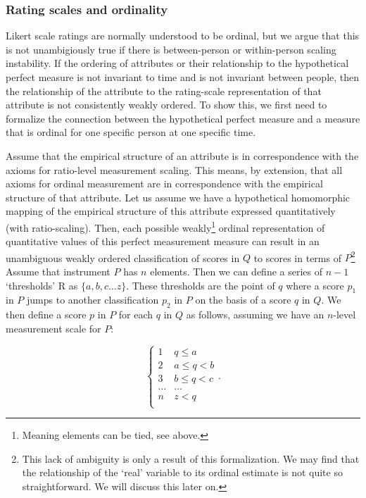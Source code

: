 \documentclass[utf8]{FrontiersinVancouver}
\begin{document}
\subsubsection{Rating scales and ordinality}
Likert scale ratings are normally understood to be ordinal, but we argue that this is not unambigiously true if there is between-person or within-person scaling instability. If the ordering of attributes or their relationship to the hypothetical perfect measure is not invariant to time and is not invariant between people, then the relationship of the attribute to the rating-scale representation of that attribute is not consistently weakly ordered. To show this, we first need to formalize the connection between the hypothetical perfect measure and a measure that is ordinal for one specific person at one specific time.

Assume that the empirical structure of an attribute is in correspondence with the axioms for ratio-level measurement scaling. This means, by extension, that all axioms for ordinal measurement are in correspondence with the empirical structure of that attribute. Let us assume we have a hypothetical homomorphic mapping of the empirical structure of this attribute expressed quantitatively (with ratio-scaling). Then, each possible weakly\footnote{Meaning elements can be tied, see above.} ordinal representation of quantitative values of this perfect measurement measure can result in an unambiguous weakly ordered classification of scores in $Q$ to scores in terms of $P$\footnote{This lack of ambiguity is only a result of this formalization. We may find that the relationship of the `real' variable to its ordinal estimate is not quite so straightforward. We will discuss this later on.} Assume that instrument $P$ has $n$ elements. Then we can define a series of $n - 1$ `thresholds' R as $\{ a, b, c \ldots z \}$. These thresholds are the point of $q$ where a score $p_1$ in $P$ jumps to another classification $p_2$ in $P$ on the basis of a score $q$ in $Q$. We then define a score $p$ in $P$ for each $q$ in $Q$ as follows, assuming we have an $n$-level measurement scale for $P$:

\[
\begin{cases} 
    1 & q \leq a\\
    2 & a \leq q < b\\
    3 & b \leq q < c\\
    \ldots & \ldots\\    
    n & z < q\\
\end{cases}.
\]
\end{document}
